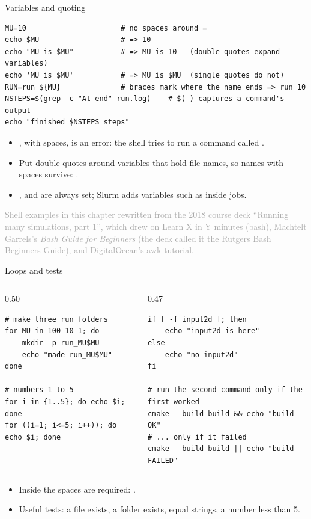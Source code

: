 \documentclass[aspectratio=169,11pt]{beamer}
\newcommand{\sourcecredit}[1]{\vfill\hfill{\tiny\textcolor{DarkGray}{#1}}}
\begin{document}
\begin{frame}[fragile]{Variables and quoting}
\begin{lstlisting}[style=shell]
MU=10                      # no spaces around =
echo $MU                   # => 10
echo "MU is $MU"           # => MU is 10   (double quotes expand variables)
echo 'MU is $MU'           # => MU is $MU  (single quotes do not)
RUN=run_${MU}              # braces mark where the name ends => run_10
NSTEPS=$(grep -c "At end" run.log)    # $( ) captures a command's output
echo "finished $NSTEPS steps"
\end{lstlisting}
\begin{itemize}\small
  \item {}, with spaces, is an error: the shell tries to run a command called .
  \item Put double quotes around variables that hold file names, so names with spaces survive: .
  \item {},  and  are always set; Slurm adds variables such as  inside jobs.
\end{itemize}
\sourcecredit{Shell examples in this chapter rewritten from the 2018 course deck ``Running many simulations, part 1'', which drew on Learn X in Y minutes (bash), Machtelt Garrels's \emph{Bash Guide for Beginners} (the deck called it the Rutgers Bash Beginners Guide), and DigitalOcean's awk tutorial.}
\end{frame}

\begin{frame}[fragile]{Loops and tests}
\begin{columns}[T,onlytextwidth]
\begin{column}{0.50\textwidth}
\begin{lstlisting}[style=shell]
# make three run folders
for MU in 100 10 1; do
    mkdir -p run_MU$MU
    echo "made run_MU$MU"
done

# numbers 1 to 5
for i in {1..5}; do echo $i; done
for ((i=1; i<=5; i++)); do echo $i; done
\end{lstlisting}
\end{column}
\begin{column}{0.47\textwidth}
\begin{lstlisting}[style=shell]
if [ -f input2d ]; then
    echo "input2d is here"
else
    echo "no input2d"
fi

# run the second command only if the first worked
cmake --build build && echo "build OK"
# ... only if it failed
cmake --build build || echo "build FAILED"
\end{lstlisting}
\end{column}
\end{columns}
\begin{itemize}\small
  \item Inside \code{[ ]} the spaces are required: \code{[ -f input2d ]}.
  \item Useful tests:  a file exists,  a folder exists,  equal strings,  a number less than 5.
\end{itemize}
\end{frame}
\end{document}
